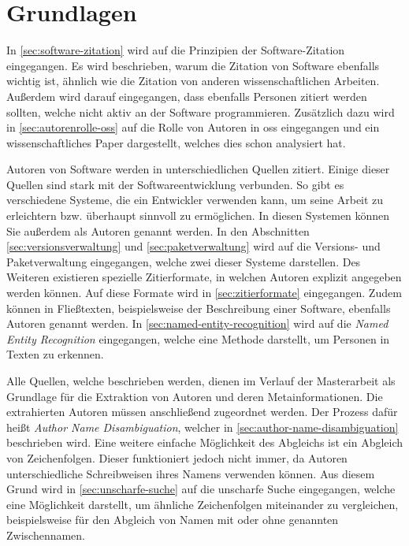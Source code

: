 \chapter{Grundlagen}
\label{chap:grundlagen}
In \autoref{sec:software-zitation} wird auf die Prinzipien der Software-Zitation eingegangen.
Es wird beschrieben, warum die Zitation von Software ebenfalls wichtig ist, ähnlich wie die Zitation von anderen wissenschaftlichen Arbeiten.
Außerdem wird darauf eingegangen, dass ebenfalls Personen zitiert werden sollten, welche nicht aktiv an der Software programmieren.
Zusätzlich dazu wird in \autoref{sec:autorenrolle-oss} auf die Rolle von Autoren in \gls{oss} eingegangen und ein wissenschaftliches Paper dargestellt, welches dies schon analysiert hat.

Autoren von Software werden in unterschiedlichen Quellen zitiert.
Einige dieser Quellen sind stark mit der Softwareentwicklung verbunden.
So gibt es verschiedene Systeme, die ein Entwickler verwenden kann, um seine Arbeit zu erleichtern bzw. überhaupt sinnvoll zu ermöglichen.
In diesen Systemen können Sie außerdem als Autoren genannt werden.
In den Abschnitten \ref{sec:versionsverwaltung} und \ref{sec:paketverwaltung} wird auf die Versions- und Paketverwaltung eingegangen, welche zwei dieser Systeme darstellen.
Des Weiteren existieren spezielle Zitierformate, in welchen Autoren explizit angegeben werden können.
Auf diese Formate wird in \autoref{sec:zitierformate} eingegangen.
Zudem können in Fließtexten, beispielsweise der Beschreibung einer Software, ebenfalls Autoren genannt werden.
In \autoref{sec:named-entity-recognition} wird auf die \emph{Named Entity Recognition} eingegangen, welche eine Methode darstellt, um Personen in Texten zu erkennen.

Alle Quellen, welche beschrieben werden, dienen im Verlauf der Masterarbeit als Grundlage für die Extraktion von Autoren und deren Metainformationen.
Die extrahierten Autoren müssen anschließend zugeordnet werden.
Der Prozess dafür heißt \emph{Author Name Disambiguation}, welcher in \autoref{sec:author-name-disambiguation} beschrieben wird.
Eine weitere einfache Möglichkeit des Abgleichs ist ein Abgleich von Zeichenfolgen.
Dieser funktioniert jedoch nicht immer, da Autoren unterschiedliche Schreibweisen ihres Namens verwenden können.
Aus diesem Grund wird in \autoref{sec:unscharfe-suche} auf die unscharfe Suche eingegangen, welche eine Möglichkeit darstellt, um ähnliche Zeichenfolgen miteinander zu vergleichen, beispielsweise für den Abgleich von Namen mit oder ohne genannten Zwischennamen.








